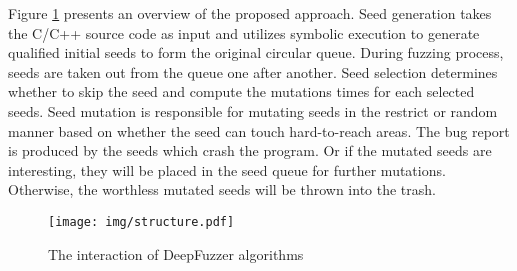 

Figure \ref{fig:interaction} presents an overview of the proposed approach. 
Seed generation takes the C/C++ source code as input and utilizes symbolic execution to generate qualified initial seeds to form the original circular queue.
During fuzzing process, seeds are taken out from the queue one after another. Seed selection determines whether to skip the seed and compute the mutations times for each selected seeds.
Seed mutation is responsible for mutating seeds in the restrict or random manner based on whether the seed can touch hard-to-reach areas. 
The bug report is produced by the seeds which crash the program.
Or if the mutated seeds are interesting, they will be placed in the seed queue for further mutations. Otherwise, the worthless mutated seeds will be thrown into the trash. 



\begin{figure}[!htbp]
 \centering
 \texttt{[image: img/structure.pdf]}
 \vspace{-0.3cm}
 \caption{The interaction of DeepFuzzer algorithms}
 \label{fig:interaction}
\end{figure}